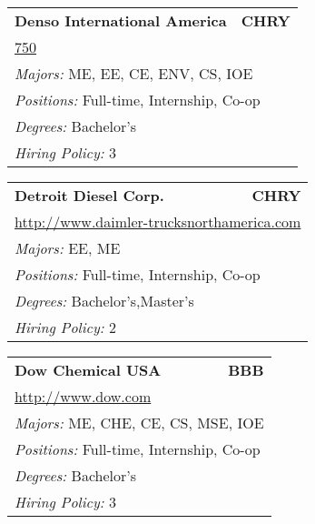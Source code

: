 \documentclass[twoside]{article}
\begin{document}
\begin{center}
\begin{multicols}{3}
\begin{FlushLeft}
\begin{minipage}{\columnwidth}
\end{minipage}
 
\begin{minipage}{\columnwidth}\begin{tabularx}{.95\columnwidth}{Xr}
                 {\Large\bf Denso International America} & {\Large\bf CHRY}\\
    \multicolumn{2}{p{.95\columnwidth}}{\url{750}}\\
    \multicolumn{2}{p{.95\columnwidth}}{\emph{Majors:} ME, EE, CE, ENV, CS, IOE}\\
    \multicolumn{2}{p{.95\columnwidth}}{\emph{Positions:} Full-time, Internship, Co-op}\\
    \multicolumn{2}{p{.95\columnwidth}}{\emph{Degrees:} Bachelor's}\\
    \multicolumn{2}{p{.95\columnwidth}}{\emph{Hiring Policy:} 3}\\
    \end{tabularx}
    
\end{minipage}
 
\begin{minipage}{\columnwidth}\begin{tabularx}{.95\columnwidth}{Xr}
                 {\Large\bf Detroit Diesel Corp.} & {\Large\bf CHRY}\\
    \multicolumn{2}{p{.95\columnwidth}}{\url{http://www.daimler-trucksnorthamerica.com}}\\
    \multicolumn{2}{p{.95\columnwidth}}{\emph{Majors:} EE, ME}\\
    \multicolumn{2}{p{.95\columnwidth}}{\emph{Positions:} Full-time, Internship, Co-op}\\
    \multicolumn{2}{p{.95\columnwidth}}{\emph{Degrees:} Bachelor's,Master's}\\
    \multicolumn{2}{p{.95\columnwidth}}{\emph{Hiring Policy:} 2}\\
    \end{tabularx}
    
\end{minipage}
 
\begin{minipage}{\columnwidth}\begin{tabularx}{.95\columnwidth}{Xr}
                 {\Large\bf Dow Chemical USA} & {\Large\bf BBB}\\
    \multicolumn{2}{p{.95\columnwidth}}{\url{http://www.dow.com}}\\
    \multicolumn{2}{p{.95\columnwidth}}{\emph{Majors:} ME, CHE, CE, CS, MSE, IOE}\\
    \multicolumn{2}{p{.95\columnwidth}}{\emph{Positions:} Full-time, Internship, Co-op}\\
    \multicolumn{2}{p{.95\columnwidth}}{\emph{Degrees:} Bachelor's}\\
    \multicolumn{2}{p{.95\columnwidth}}{\emph{Hiring Policy:} 3}\\
    \end{tabularx}
    

\end{minipage}
\end{FlushLeft}
\end{multicols}
\end{center}
\end{document}
